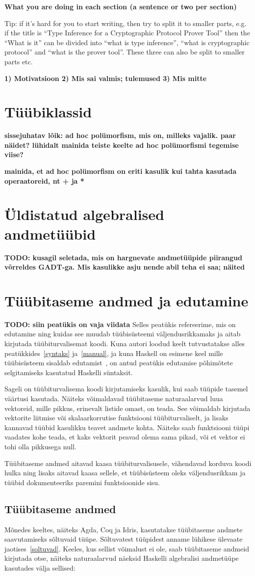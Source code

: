 \documentclass[12pt]{article}
\newcommand\peatykk[1]{
  \clearpage
  \section{#1}}
\newcommand\markus[1]{\textcolor{roheline}{\textbf{#1}}}
\begin{document}
    \markus{What you are doing in each section (a sentence or two per section)}

    Tip: if it's hard for you to start writing, then try to split it to smaller parts, e.g. if the title is ``Type Inference for a Cryptographic Protocol Prover Tool'' then the ``What is it'' can be divided into ``what is type inference'', ``what is cryptographic protocol'' and ``what is the prover tool''. These three can also be split to smaller parts etc.

    \markus{1) Motivatsioon 2) Mis sai valmis; tulemused 3) Mis mitte}
  \peatykk{Tüübiklassid}
    \markus{sissejuhatav lõik: ad hoc polümorfism, mis on, milleks vajalik. paar näidet? lühidalt mainida teiste keelte ad hoc polümorfismi tegemise viise?}

    \markus{mainida, et ad hoc polümorfism on eriti kasulik kui tahta kasutada operaatoreid, nt + ja *}
  \peatykk{Üldistatud algebralised andmetüübid}
    \markus{TODO: kusagil seletada, mis on hargnevate andmetüüpide piirangud võrreldes GADT-ga. Mis kasulikke asju nende abil teha ei saa; näited}
  \peatykk{Tüübitaseme andmed ja edutamine}
    \markus{TODO: siin peatükis on vaja viidata} Selles peatükis refereerime, mis on edutamine ning kuidas see muudab tüübisüsteemi väljendusrikkamaks ja aitab kirjutada tüübiturvalisemat koodi. Kuna autori loodud keelt tutvustatakse alles peatükkides~\ref{syntaks} ja~\ref{manual}, ja kuna Haskell on esimene keel mille tüübisüsteem sisaldab edutamist~\cite{Giv}, on antud peatükis edutamise põhimõtete selgitamiseks kasutatud Haskelli süntaksit.

    Sageli on tüübiturvalisema koodi kirjutamiseks kasulik, kui saab tüüpide tasemel väärtusi kasutada. Näiteks võimaldavad tüübitaseme naturaalarvud luua vektoreid, mille pikkus, erinevalt listide omast, on teada. See võimaldab kirjutada vektorite liitmise või skalaarkorrutise funktsiooni tüübiturvaliselt, ja lisaks kannavad tüübid kasulikku teavet andmete kohta. Näiteks saab funktsiooni tüüpi vaadates kohe teada, et kaks vektorit peavad olema sama pikad, või et vektor ei tohi olla pikkusega null.

    Tüübitaseme andmed aitavad kaasa tüübiturvalisusele, vähendavad korduva koodi hulka ning lisaks aitavad kaasa sellele, et tüübisüsteem oleks väljendusrikkam ja tüübid dokumenteeriks paremini funktsioonide sisu.
    \subsection{Tüübitaseme andmed}
      Mõnedes keeltes, näiteks Agda, Coq ja Idris, kasutatakse tüübitaseme andmete saavutamiseks sõltuvaid tüüpe. Sõltuvatest tüüpidest anname lühikese ülevaate jaotises~\ref{soltuvad}. Keeles, kus sellist võimalust ei ole, saab tüübitaseme andmeid kirjutada otse, näiteks naturaalarvud näeksid Haskelli algebralisi andmetüüpe kasutades välja sellised:
\end{document}
